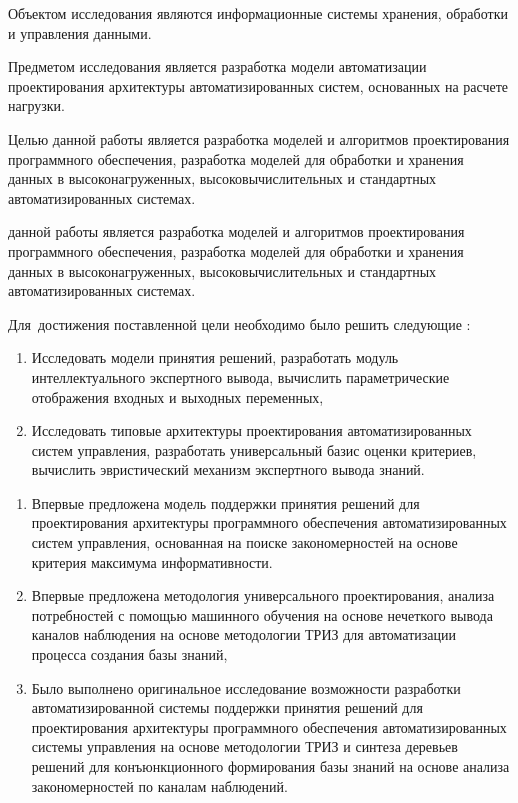 \ifsynopsis
Объектом исследования являются информационные системы хранения, обработки и управления данными.

Предметом исследования является разработка модели автоматизации проектирования архитектуры автоматизированных систем, основанных на расчете нагрузки.

Целью данной работы является разработка моделей и алгоритмов проектирования программного обеспечения, разработка моделей для обработки и хранения данных в высоконагруженных, высоковычислительных и стандартных автоматизированных системах.
\else


\fi


{\aim} данной работы является  разработка моделей и алгоритмов проектирования программного обеспечения, разработка моделей для обработки и хранения данных в высоконагруженных, высоковычислительных и стандартных автоматизированных системах.

Для~достижения поставленной цели необходимо было решить следующие {\tasks}:
\begin{enumerate}[beginpenalty=10000] %
  \item Исследовать модели принятия решений, разработать модуль интеллектуального экспертного вывода, вычислить параметрические отображения входных и выходных переменных,
  \item Исследовать типовые архитектуры проектирования автоматизированных систем управления, разработать универсальный базис оценки критериев, вычислить эвристический механизм экспертного вывода знаний.
\end{enumerate}


{\novelty}
\begin{enumerate}[beginpenalty=10000] %
  \item Впервые предложена модель поддержки принятия решений для проектирования архитектуры программного обеспечения автоматизированных систем управления, основанная на поиске закономерностей на основе критерия максимума информативности.
  \item Впервые предложена методология универсального проектирования, анализа потребностей с помощью машинного обучения на основе нечеткого вывода каналов наблюдения на основе методологии ТРИЗ для автоматизации процесса создания базы знаний,
  \item Было выполнено оригинальное исследование возможности разработки автоматизированной системы поддержки принятия решений для проектирования архитектуры программного обеспечения автоматизированных системы управления на основе методологии ТРИЗ и синтеза деревьев решений для конъюнкционного формирования базы знаний на основе анализа закономерностей по каналам наблюдений.
\end{enumerate}



